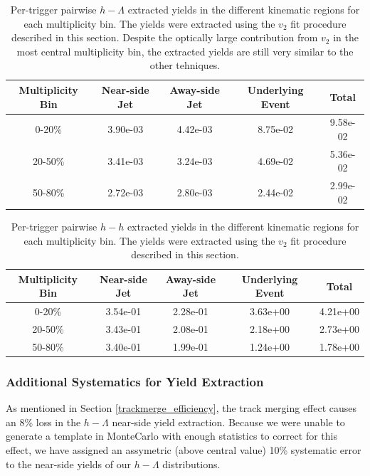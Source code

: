 \documentclass[ALICE,manyauthors]{ALICE_analysis_notes}
\begin{document}
\begin{table}[h!]
\centering
\begin{tabular}{| c | c | c | c | c | }
\hline
Multiplicity Bin & Near-side Jet & Away-side Jet & Underlying Event & Total  \\
\hline
	
0-20\% & 3.90e-03 & 4.42e-03 & 8.75e-02 & 9.58e-02 \\
20-50\% & 3.41e-03 & 3.24e-03 & 4.69e-02 & 5.36e-02 \\
50-80\% & 2.72e-03 & 2.80e-03 & 2.44e-02 & 2.99e-02 \\
	
\hline
\end{tabular}
\caption{Per-trigger pairwise $h-\Lambda$ extracted yields in the different kinematic regions for each multiplicity bin. The yields were extracted using the $v_{2}$ fit procedure described in this section. Despite the optically large contribution from $v_{2}$ in the most central multiplicity bin, the extracted yields are still very similar to the other tehniques.}
\label{h_lambda_yield_table_v2fit}
\end{table}
	
\begin{table}[h!]
\centering
\begin{tabular}{| c | c | c | c | c | }
\hline
Multiplicity Bin & Near-side Jet & Away-side Jet & Underlying Event & Total  \\
\hline

0-20\% & 3.54e-01 & 2.28e-01 & 3.63e+00 & 4.21e+00 \\
20-50\% & 3.43e-01 & 2.08e-01 & 2.18e+00 & 2.73e+00 \\
50-80\% & 3.40e-01 & 1.99e-01 & 1.24e+00 & 1.78e+00 \\

\hline
\end{tabular}
\caption{Per-trigger pairwise $h-h$ extracted yields in the different kinematic regions for each multiplicity bin. The yields were extracted using the $v_{2}$ fit procedure described in this section.}
\label{h_h_yield_table_v2fit}
\end{table}

\subsubsection{Additional Systematics for Yield Extraction}
As mentioned in Section \ref{trackmerge_efficiency}, the track merging effect causes an 8\% loss in the $h-\Lambda$ near-side yield extraction. Because we were unable to generate a template in MonteCarlo with enough statistics to correct for this effect, we have assigned an assymetric (above central value) 10\% systematic error to the near-side yields of our $h-\Lambda$ distributions.
\end{document}
